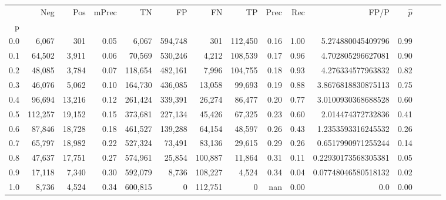 \begin{tabular}{rrrrrrrrrrrrrrr}
\toprule
{} &      Neg &     Pos & mPrec &       TN &       FP &       FN &       TP &  Prec &   Rec &                 FP/P & $\hat{p}$ \\
p   &          &         &       &          &          &          &          &       &       &                      &           \\
\midrule
0.0 &    6,067 &     301 &  0.05 &    6,067 &  594,748 &      301 &  112,450 &  0.16 &  1.00 &    5.274880045409796 &      0.99 \\
0.1 &   64,502 &   3,911 &  0.06 &   70,569 &  530,246 &    4,212 &  108,539 &  0.17 &  0.96 &    4.702805296627081 &      0.90 \\
0.2 &   48,085 &   3,784 &  0.07 &  118,654 &  482,161 &    7,996 &  104,755 &  0.18 &  0.93 &    4.276334577963832 &      0.82 \\
0.3 &   46,076 &   5,062 &  0.10 &  164,730 &  436,085 &   13,058 &   99,693 &  0.19 &  0.88 &   3.8676818830875113 &      0.75 \\
0.4 &   96,694 &  13,216 &  0.12 &  261,424 &  339,391 &   26,274 &   86,477 &  0.20 &  0.77 &   3.0100930368688528 &      0.60 \\
0.5 &  112,257 &  19,152 &  0.15 &  373,681 &  227,134 &   45,426 &   67,325 &  0.23 &  0.60 &    2.014474372732836 &      0.41 \\
0.6 &   87,846 &  18,728 &  0.18 &  461,527 &  139,288 &   64,154 &   48,597 &  0.26 &  0.43 &   1.2353593316245532 &      0.26 \\
0.7 &   65,797 &  18,982 &  0.22 &  527,324 &   73,491 &   83,136 &   29,615 &  0.29 &  0.26 &   0.6517990971255244 &      0.14 \\
0.8 &   47,637 &  17,751 &  0.27 &  574,961 &   25,854 &  100,887 &   11,864 &  0.31 &  0.11 &  0.22930173568305381 &      0.05 \\
0.9 &   17,118 &   7,340 &  0.30 &  592,079 &    8,736 &  108,227 &    4,524 &  0.34 &  0.04 &  0.07748046580518132 &      0.02 \\
1.0 &    8,736 &   4,524 &  0.34 &  600,815 &        0 &  112,751 &        0 &   nan &  0.00 &                  0.0 &      0.00 \\
\bottomrule
\end{tabular}
